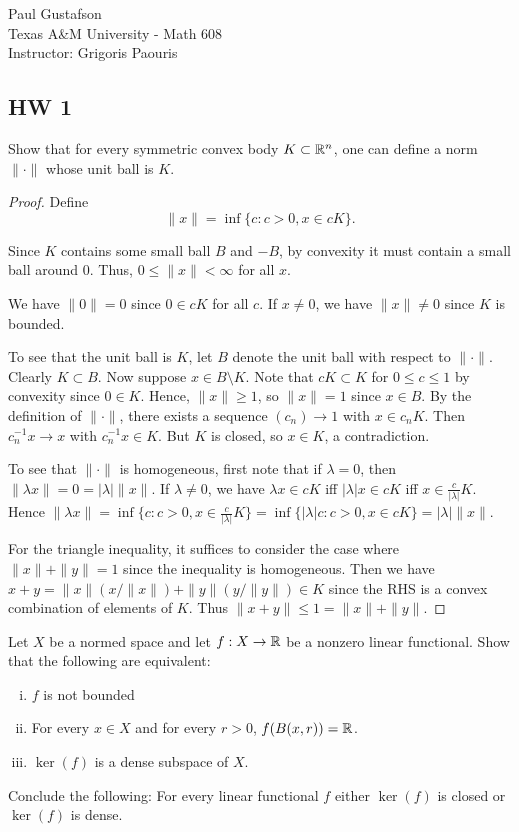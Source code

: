 \documentclass{article}
\begin{document}
\noindent Paul Gustafson\\
\noindent Texas A\&M University - Math 608 \\ 
\noindent Instructor: Grigoris Paouris

\subsection*{HW 1}
 Show that for every symmetric convex body $K \subset \mathbb{R}^n$, one can define a norm $\| \cdot \|$ whose unit ball is $K$.
\begin{proof}
Define $$\|x\| = \inf \{ c: c > 0, x \in cK \}.$$

Since $K$ contains some small ball $B$ and $-B$, by convexity it must contain a small ball around $0$.  Thus, $0 \le \|x\| < \infty$ for all $x$.

We have $\|0\| =  0$ since $0 \in cK$ for all $c$.  If $x \neq 0$, we have $\|x\| \neq 0$ since $K$ is bounded.

To see that the unit ball is $K$, let $B$ denote the unit ball with respect to $\| \cdot \|$. Clearly $K \subset B$. Now suppose $x \in B \setminus K$.  Note that $cK \subset K$ for $0 \le c \le 1$ by convexity since $0 \in K$. Hence, $\|x\| \ge 1$, so $\|x\| = 1$ since $x \in B$.  By the definition of $\|\cdot\|$, there exists a sequence $(c_n) \to 1$ with $x \in c_nK$. Then $c_n^{-1} x \to x$ with $c_n^{-1} x \in K$.  But $K$ is closed, so $x \in K$, a contradiction.

To see that $\| \cdot \|$ is homogeneous, first note that if $\lambda = 0$, then $\|\lambda x\| = 0 = |\lambda| \|x\|$.  If $\lambda \neq 0$, we have $\lambda x \in cK$ iff $|\lambda|x \in cK$ iff $x \in \frac {c}{|\lambda|} K$. Hence $\|\lambda x\| = \inf \{ c: c > 0, x \in \frac{c}{|\lambda|}K \} = 
\inf \{ |\lambda| c: c > 0, x \in cK \} = |\lambda| \|x\|$.

For the triangle inequality, it suffices to consider the case where $\|x\| + \|y\| = 1$ since the inequality is homogeneous. Then we have
$x + y = \|x\| (x / \|x\|)  + \|y \| (y / \|y\|) \in K$ since the RHS is a convex combination of elements of $K$.  Thus $\|x + y\| \le 1 = \|x\| + \|y\|$.
\end{proof}

 Let $X$ be a normed space and let $f: X \to \mathbb{R}$ be a nonzero linear functional. Show that the following are equivalent:
\begin{enumerate}[(i)]
\item $f$ is not bounded
\item For every $x \in X$ and for every $r > 0$, $f(B(x,r)) = \mathbb{R}$.
\item $\ker(f)$ is a dense subspace of $X$.
\end{enumerate}
Conclude the following: For every linear functional $f$ either $\ker(f)$ is closed or $\ker(f)$ is dense. 
\end{document}
